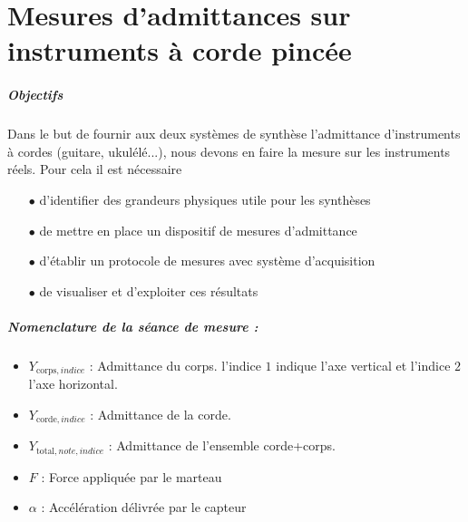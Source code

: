 
\chapter{Mesures d'admittances sur instruments à corde pincée}
\vspace{5mm}
\paragraph*{Objectifs}

Dans le but de fournir aux deux systèmes de synthèse l'admittance d'instruments
à cordes (guitare, ukulélé...), nous devons en faire la mesure sur les
instruments réels. Pour cela il est nécessaire 

\begin{itemize}
\item[$\bullet$] d'identifier des grandeurs physiques utile pour les synthèses
\item[$\bullet$] de mettre en place un dispositif de mesures d'admittance
\item[$\bullet$] d'établir un protocole de mesures avec système d'acquisition 
\item[$\bullet$] de visualiser et d'exploiter ces résultats 
\end{itemize}


\paragraph*{Nomenclature de la séance de mesure : \\} 
\begin{itemize}
\item $Y_{\text{corps},indice}$ : Admittance du corps. l'indice $1$ indique l'axe vertical et l'indice $2$ l'axe horizontal.
\item $Y_{\text{corde},indice}$ : Admittance de la corde.
\item $Y_{\text{total},note,indice}$ : Admittance de l'ensemble corde+corps.
\item $F$ : Force appliquée par le marteau 
\item $\alpha$ : Accélération délivrée par le capteur 
\end{itemize}

